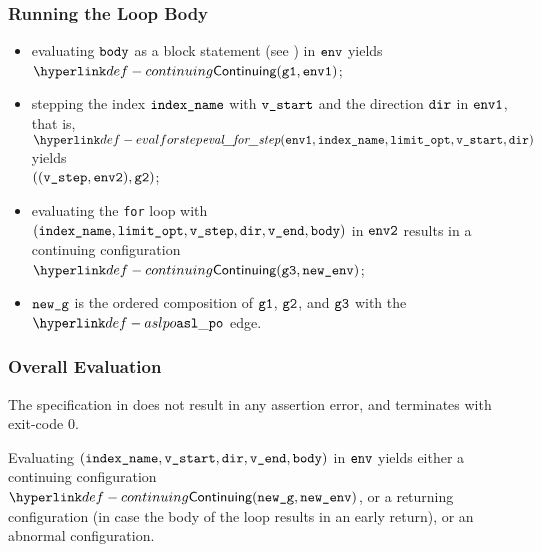 \subsubsection{Running the Loop Body}
\AllApply
\begin{itemize}
  \item evaluating $\texttt{body}$ as a block statement (see ) in $\texttt{env}$
        yields \\ $\Continuing(\vgone, \envone)$\ProseTerminateAs{\ReturningConfig, \ThrowingConfig, \DynErrorConfig};
  \item stepping the index $\texttt{index\_name}$ with $\texttt{v\_start}$ and the direction $\texttt{dir}$ in $\texttt{env1}$,
        that is, $\evalforstep(\envone, \vindexname, \vlimitopt, \vstart, \dir)$ yields \\
        $((\texttt{v\_step}, \texttt{env2}), \texttt{g2})$;
  \item evaluating the \texttt{for} loop with $(\texttt{index\_name}, \texttt{limit\_opt}, \texttt{v\_step}, \texttt{dir}, \texttt{v\_end}, \texttt{body})$
        in $\texttt{env2}$ results in a continuing configuration $\Continuing(\vgthree, \newenv)$\ProseTerminateAs{\ReturningConfig, \ThrowingConfig, \DynErrorConfig};
  \item $\texttt{new\_g}$ is the ordered composition of $\texttt{g1}$, $\texttt{g2}$, and $\texttt{g3}$ with the $\aslpo$
        edge.
\end{itemize}

\subsubsection{Overall Evaluation}
The specification in 
does not result in any assertion error, and terminates with exit-code $0$.

Evaluating $(\texttt{index\_name}, \texttt{v\_start}, \texttt{dir}, \texttt{v\_end}, \texttt{body})$ in $\texttt{env}$ yields either
a continuing configuration $\Continuing(\newg, \newenv)$, or a returning configuration
(in case the body of the loop results in an early return),
or an abnormal configuration.

